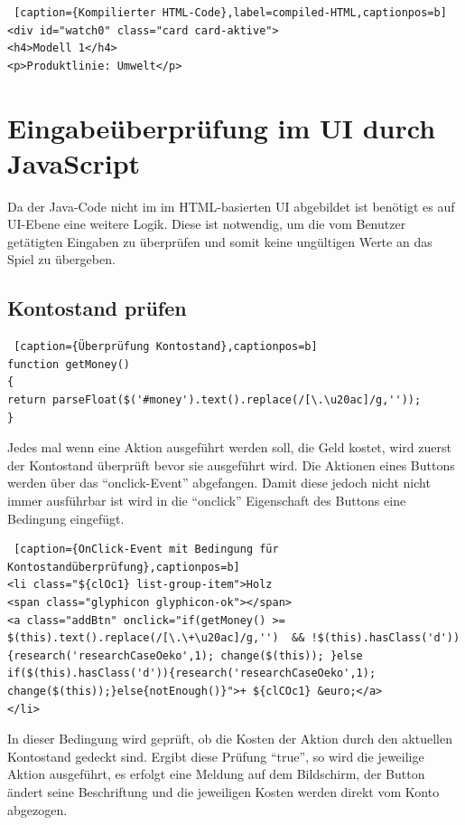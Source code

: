 \lstset{language=HTML}
\begin{lstlisting} [caption={Kompilierter HTML-Code},label=compiled-HTML,captionpos=b]
<div id="watch0" class="card card-aktive">
<h4>Modell 1</h4>
<p>Produktlinie: Umwelt</p>
\end{lstlisting} 

\section{Eingabeüberprüfung im UI durch JavaScript}
Da der Java-Code nicht im im HTML-basierten UI abgebildet ist benötigt es auf UI-Ebene eine weitere Logik. Diese ist notwendig, um die vom Benutzer getätigten Eingaben zu überprüfen und somit keine ungültigen Werte an das Spiel zu übergeben. 

\subsection*{Kontostand prüfen}

\lstset{language=Java}
\begin{lstlisting} [caption={Überprüfung Kontostand},captionpos=b]
function getMoney()
{
return parseFloat($('#money').text().replace(/[\.\u20ac]/g,''));
}
\end{lstlisting}

Jedes mal wenn eine Aktion ausgeführt werden soll, die Geld kostet, wird zuerst der Kontostand überprüft bevor sie ausgeführt wird. Die Aktionen eines Buttons werden über das \enquote{onclick-Event} abgefangen. Damit diese jedoch nicht nicht immer ausführbar ist wird in die \enquote{onclick} Eigenschaft des Buttons eine Bedingung eingefügt. 

\lstset{language=HTML}
\begin{lstlisting} [caption={OnClick-Event mit Bedingung für Kontostandüberprüfung},captionpos=b]
<li class="${clOc1} list-group-item">Holz 
<span class="glyphicon glyphicon-ok"></span>
<a class="addBtn" onclick="if(getMoney() >= $(this).text().replace(/[\.\+\u20ac]/g,'')  && !$(this).hasClass('d')){research('researchCaseOeko',1); change($(this)); }else if($(this).hasClass('d')){research('researchCaseOeko',1); change($(this));}else{notEnough()}">+ ${clCOc1} &euro;</a>
</li>
\end{lstlisting}

In dieser Bedingung wird geprüft, ob die Kosten der Aktion durch den aktuellen Kontostand gedeckt sind. Ergibt diese Prüfung \enquote{true}, so wird die jeweilige Aktion ausgeführt, es erfolgt eine Meldung auf dem Bildschirm, der Button ändert seine Beschriftung und die jeweiligen Kosten werden direkt vom Konto abgezogen.

